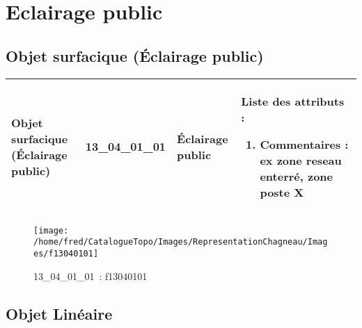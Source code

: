 \documentclass[12pt,titlepage]{book}
\begin{document}
\section{\large Eclairage public}
\subsection{Objet surfacique (Éclairage public)}
\noindent
\vspace{\baselineskip}

\renewcommand{\arraystretch}{1.2}
\begin{supertabular}{|p{10cm}|c|p{13cm}|p{12cm}|}
 Objet surfacique (Éclairage public) & 13\_04\_01\_01 & Éclairage public & Liste des attributs :
\begin{enumerate}
  \item Commentaires : ex zone reseau enterré, zone poste X\end{enumerate}
\\
\hline
\end{supertabular}
\begin{figure}[h!]
  \hfill         %
  \begin{minipage}[t]{3cm}
    \begin{center}
      \texttt{[image: /home/fred/CatalogueTopo/Images/RepresentationChagneau/Images/f13040101]}
      \caption[~13\_04\_01\_01]{\small{13\_04\_01\_01~:} \tiny{f13040101}}\label{f13040101}
    \end{center}
  \end{minipage}
\end{figure}


\subsection{Objet Linéaire}
\noindent
\vspace{\baselineskip}
\end{document}
